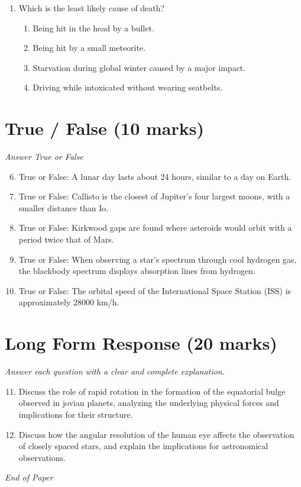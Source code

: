 \documentclass[12pt]{article}
\begin{document}
\begin{enumerate}[label=\arabic*.]
\begin{enumerate}[label=(\alph*)]
    \item plankton that use sunlight as an energy source through photosynthesis
\end{enumerate}
\item Which is the least likely cause of death?
\begin{enumerate}[label=(\alph*)]
    \item Being hit in the head by a bullet.
    \item Being hit by a small meteorite.
    \item Starvation during global winter caused by a major impact.
    \item Driving while intoxicated without wearing seatbelts.
\end{enumerate}
\end{enumerate}

\section*{True / False (10 marks)}
\textit{Answer True or False}
\begin{enumerate}[label=\arabic*.]
\setcounter{enumi}{5}
\item True or False: A lunar day lasts about 24 hours, similar to a day on Earth.
\item True or False: Callisto is the closest of Jupiter's four largest moons, with a smaller distance than Io.
\item True or False: Kirkwood gaps are found where asteroids would orbit with a period twice that of Mars.
\item True or False: When observing a star's spectrum through cool hydrogen gas, the blackbody spectrum displays absorption lines from hydrogen.
\item True or False: The orbital speed of the International Space Station (ISS) is approximately 28000 km/h.
\end{enumerate}

\section*{Long Form Response (20 marks)}
\textit{Answer each question with a clear and complete explanation.}
\begin{enumerate}[label=\arabic*.]
\setcounter{enumi}{10}
\item Discuss the role of rapid rotation in the formation of the equatorial bulge observed in jovian planets, analyzing the underlying physical forces and implications for their structure.
\item Discuss how the angular resolution of the human eye affects the observation of closely spaced stars, and explain the implications for astronomical observations.
\end{enumerate}

\vfill
\noindent\textit{End of Paper}
\end{document}
